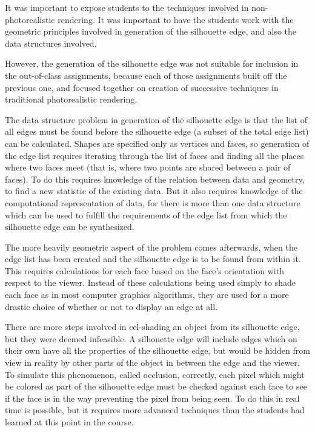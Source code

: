 \documentclass[10pt,twocolumn]{article}
\begin{document}
It was important to expose students to the techniques involved in non-photorealistic rendering.  It was important to have the students work with the geometric principles involved in generation of the silhouette edge, and also the data structures involved.  

However, the generation of the silhouette edge was not suitable for inclusion in the out-of-class assignments, because each of those assignments built off the previous one, and focused together on creation of successive techniques in traditional photorealistic rendering.  

The data structure problem in generation of the silhouette edge is that the list of all edges must be found before the silhouette edge (a subset of the total edge list) can be calculated.  Shapes are specified only as vertices and faces, so generation of the edge list requires iterating through the list of faces and finding all the places where two faces meet (that is, where two points are shared between a pair of faces).  To do this requires knowledge of the relation between data and geometry, to find a new statistic of the existing data.  But it also requires knowledge of the computational representation of data, for there is more than one data structure which can be used to fulfill the requirements of the edge list from which the silhouette edge can be synthesized.  

The more heavily geometric aspect of the problem comes afterwards, when the edge list has been created and the silhouette edge is to be found from within it.  This requires calculations for each face based on the face's orientation with respect to the viewer.  Instead of these calculations being used simply to shade each face as in most computer graphics algorithms, they are used for a more drastic choice of whether or not to display an edge at all.  

There are more steps involved in cel-shading an object from its silhouette edge, but they were deemed infeasible.  A silhouette edge will include edges which on their own have all the properties of the silhouette edge, but would be hidden from view in reality by other parts of the object in between the edge and the viewer.  To simulate this phenomenon, called occlusion, correctly, each pixel which might be colored as part of the silhouette edge must be checked against each face to see if the face is in the way preventing the pixel from being seen.  To do this in real time is possible, but it requires more advanced techniques than the students had learned at this point in the course.  
\end{document}

